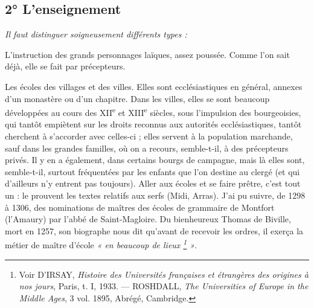 \documentclass[french,twoside]{book} %
\newlength{\listmod}
\newcommand{\listhead}[1]{\hspace{-1\listmod}\emph{#1}}
\newcommand\chapterclose{} %
\begin{document}
\subsection[2° L’enseignement]{2° L’enseignement}

\begin{listalpha}[itemsep=0pt,]
\item[]\listhead{Il faut distinguer soigneusement différents types :}
\item L’instruction des grands personnages laïques, assez poussée. Comme l’on sait déjà, elle se fait par précepteurs.
\item Les écoles des villages et des villes. Elles sont ecclésiastiques en général, annexes d’un monastère ou d’un chapitre. Dans les villes, elles se sont beaucoup développées au cours des XII\textsuperscript{e} et XIII\textsuperscript{e} siècles, sous l’impulsion des bourgeoisies, qui tantôt empiètent sur les droits reconnus aux autorités ecclésiastiques, tantôt cherchent à s’accorder avec celles-ci ; elles servent à la population marchande, sauf dans les grandes familles, où on a recours, semble-t-il, à des précepteurs privés. Il y en a également, dans certains bourgs de campagne, mais là elles sont, semble-t-il, surtout fréquentées par les enfants que l’on destine au clergé (et qui d’ailleurs n’y entrent pas toujours). Aller aux écoles et se faire prêtre, c’est tout un : le prouvent les textes relatifs aux serfs (Midi, Arras). J’ai pu suivre, de 1298 à 1306, des nominations de maîtres des écoles de grammaire de Montfort (l’Amaury) par l’abbé de Saint-Magloire. Du bienheureux Thomas de Biville, mort en 1257, son biographe nous dit qu’avant de recevoir les ordres, il exerça la métier de maître d’école \emph{« en beaucoup de lieux \footnote{ Voir D’IRSAY, {\itshape Histoire des Universités françaises et étrangères des origines à nos jours}, Paris, t. I, 1933. — ROSHDALL, {\itshape The Universities of Europe in the Middle Ages}, 3 vol. 1895, Abrégé, Cambridge.} »}.

\end{listalpha}\chapterclose
\end{document}
